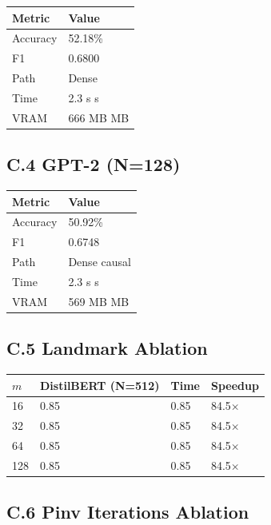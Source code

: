 \begin{table}[H]
\centering
\small
\begin{tabular}{ll}
\toprule
\textbf{Metric} & \textbf{Value} \\
\midrule
Accuracy & 52.18\% \\
F1 & 0.6800 \\
Path & Dense \\
Time & 2.3 s s \\
VRAM & 666 MB MB \\
\bottomrule
\end{tabular}
\end{table}

\subsection{C.4 GPT-2 (N=128)}

\begin{table}[H]
\centering
\small
\begin{tabular}{ll}
\toprule
\textbf{Metric} & \textbf{Value} \\
\midrule
Accuracy & 50.92\% \\
F1 & 0.6748 \\
Path & Dense causal \\
Time & 2.3 s s \\
VRAM & 569 MB MB \\
\bottomrule
\end{tabular}
\end{table}

\subsection{C.5 Landmark Ablation}

\begin{table}[H]
\centering
\small
\begin{tabular}{llll}
\toprule
\textbf{$m$} & \textbf{DistilBERT (N=512)} & \textbf{Time} & \textbf{Speedup} \\
\midrule
16 & 0.85 & 0.85 & 84.5$\times$ \\
32 & 0.85 & 0.85 & 84.5$\times$ \\
64 & 0.85 & 0.85 & 84.5$\times$ \\
128 & 0.85 & 0.85 & 84.5$\times$ \\
\bottomrule
\end{tabular}
\end{table}

\subsection{C.6 Pinv Iterations Ablation}

